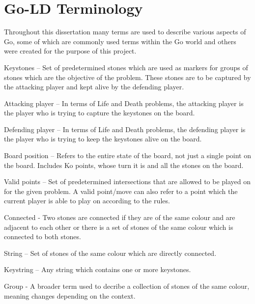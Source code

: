\documentclass{l4proj}
\begin{document}
\section{Go-LD Terminology}

Throughout this dissertation many terms are used to describe various aspects of Go, some of which are commonly used terms within the Go world and others were created for the purpose of this project.

Keystones – Set of predetermined stones which are used as markers for groups of stones which are the objective of the problem. These stones are to be captured by the attacking player and kept alive by the defending player.

Attacking player – In terms of Life and Death problems, the attacking player is the player who is trying to capture the keystones on the board.

Defending player – In terms of Life and Death problems, the defending player is the player who is trying to keep the keystones alive on the board.

Board position – Refers to the entire state of the board, not just a single point on the board. Includes Ko points, whose turn it is and all the stones on the board.

Valid points – Set of predetermined intersections that are allowed to be played on for the given problem. A valid point/move can also refer to a point which the current player is able to play on according to the rules.

Connected - Two stones are connected if they are of the same colour and are adjacent to each other or there is a set of stones of the same colour which is connected to both stones.

String – Set of stones of the same colour which are directly connected.

Keystring – Any string which contains one or more keystones.

Group - A broader term used to decribe a collection of stones of the same colour, meaning changes depending on the context.
\end{document}
